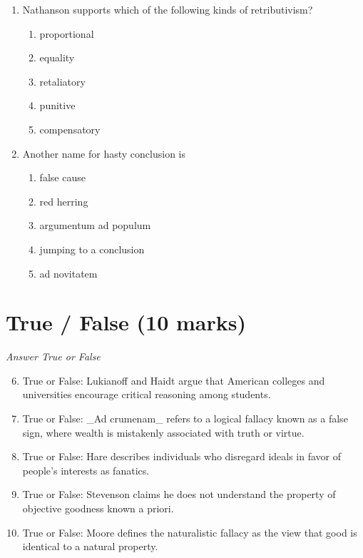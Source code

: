 \documentclass[12pt]{article}
\begin{document}
\begin{enumerate}[label=\arabic*.]
\begin{enumerate}[label=(\alph*)]
\end{enumerate}
\item Nathanson supports which of the following kinds of retributivism?
\begin{enumerate}[label=(\alph*)]
    \item proportional
    \item equality
    \item retaliatory
    \item punitive
    \item compensatory
\end{enumerate}
\item Another name for hasty conclusion is
\begin{enumerate}[label=(\alph*)]
    \item false cause
    \item red herring
    \item argumentum ad populum
    \item jumping to a conclusion
    \item ad novitatem
\end{enumerate}
\end{enumerate}

\section*{True / False (10 marks)}
\textit{Answer True or False}
\begin{enumerate}[label=\arabic*.]
\setcounter{enumi}{5}
\item True or False: Lukianoff and Haidt argue that American colleges and universities encourage critical reasoning among students.
\item True or False: \_Ad crumenam\_ refers to a logical fallacy known as a false sign, where wealth is mistakenly associated with truth or virtue.
\item True or False: Hare describes individuals who disregard ideals in favor of people's interests as fanatics.
\item True or False: Stevenson claims he does not understand the property of objective goodness known a priori.
\item True or False: Moore defines the naturalistic fallacy as the view that good is identical to a natural property.
\end{enumerate}
\end{document}
